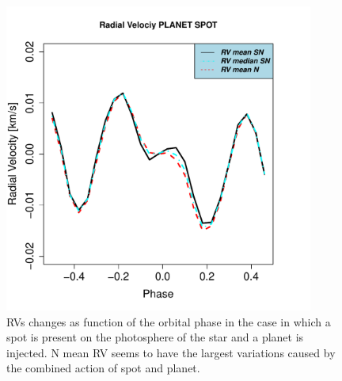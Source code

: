\documentclass[11pt, oneside]{article}
\begin{document}
\begin{figure}[htbp]
   \centering
\includegraphics[height = 4in]{RV_comparison_PLANET_SPOT.pdf} 
 \caption{RVs changes as function of the orbital phase in the case in which a spot is present on the photosphere of the star and a planet is injected. N mean RV seems to have the largest variations caused by the combined action of spot and planet.}
    \label{fig:spot.plus.planet}
\end{figure}
\end{document}
